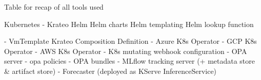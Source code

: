 \newpage







Table for recap of all tools used

Kubernetes
- Krateo
Helm
    Helm charts
    Helm templating
    Helm lookup function

- VmTemplate Krateo Composition Definition
- Azure K8s Operator
- GCP K8s Operator
- AWS K8s Operator
- K8s mutating webhook configuration
- OPA server
- opa policies
- OPA bundles
- MLflow tracking server (+ metadata store & artifact store)
- Forecaster (deployed as KServe InferenceService)


\newpage
